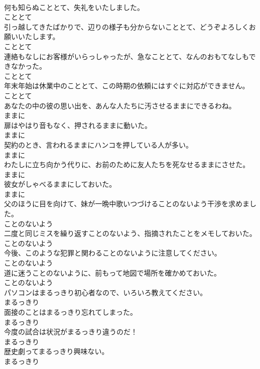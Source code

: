\documentclass[8pt]{extreport}
\begin{document}
\begin{CJK}{UTF8}{min}
\\	何も知らぬこととて、失礼をいたしました。	
\\	こととて
\\	引っ越してきたばかりで、辺りの様子も分からないこととて、どうぞよろしくお願いいたします。	
\\	こととて
\\	連絡もなしにお客様がいらっしゃったが、急なこととて、なんのおもてなしもできなかった。	
\\	こととて
\\	年末年始は休業中のこととて、この時期の依頼にはすぐに対応ができません。	
\\	こととて
\\	あなたの中の彼の思い出を、あんな人たちに汚させるままにできるわね。	
\\	ままに
\\	扉はやはり音もなく、押されるままに動いた。	
\\	ままに
\\	契約のとき、言われるままにハンコを押している人が多い。	
\\	ままに
\\	わたしに立ち向かう代りに、お前のために友人たちを死なせるままにさせた。	
\\	ままに
\\	彼女がしゃべるままにしておいた。	
\\	ままに
\\	父のほうに目を向けて、妹が一晩中歌いつづけることのないよう干渉を求めました。	
\\	ことのないよう
\\	二度と同じミスを繰り返すことのないよう、指摘されたことをメモしておいた。	
\\	ことのないよう
\\	今後、このような犯罪と関わることのないように注意してください。	
\\	ことのないよう
\\	道に迷うことのないように、前もって地図で場所を確かめておいた。	
\\	ことのないよう
\\	パソコンはまるっきり初心者なので、いろいろ教えてください。	
\\	まるっきり
\\	面接のことはまるっきり忘れてしまった。	
\\	まるっきり
\\	今度の試合は状況がまるっきり違うのだ！	
\\	まるっきり
\\	歴史劇ってまるっきり興味ない。	
\\	まるっきり

\end{CJK}
\end{document}
